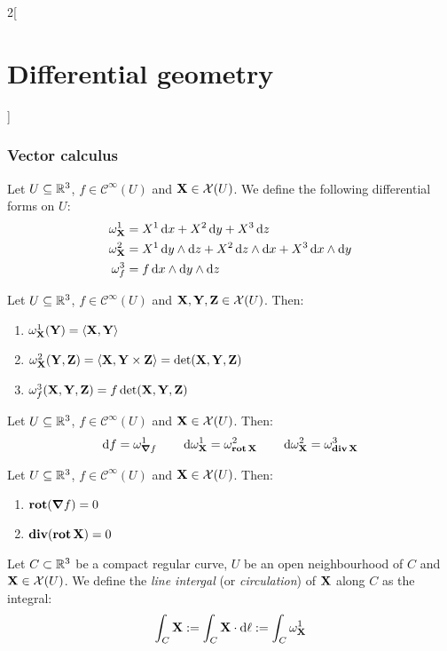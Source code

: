 \documentclass[../../../main_math.tex]{subfiles}
\begin{document}
\begin{multicols}{2}[\section{Differential geometry}]
  \subsubsection{Vector calculus}
  \begin{definition}
    Let $U\subseteq\mathbb{R}^3$, $f\in\mathcal{C}^\infty(U)$ and $\boldsymbol{\mathrm{X}}\in\mathcal{X}(U)$. We define the following differential forms on $U$:
    \begin{align*}
      \omega_{\boldsymbol{\mathrm{X}}}^1 & =X^1\dd{x}+X^2\dd{y}+X^3\dd{z}                                     \\
      \omega_{\boldsymbol{\mathrm{X}}}^2 & =X^1\dd{y}\wedge\dd{z}+X^2\dd{z}\wedge\dd{x}+X^3\dd{x}\wedge\dd{y} \\
      \omega_{f}^3      & =f\dd{x}\wedge\dd{y}\wedge\dd{z}
    \end{align*}
  \end{definition}
  \begin{lemma}
    Let $U\subseteq\mathbb{R}^3$, $f\in\mathcal{C}^\infty(U)$ and $\boldsymbol{\mathrm{X}},\boldsymbol{\mathrm{Y}},\boldsymbol{\mathrm{Z}}\in\mathcal{X}(U)$. Then:
    \begin{enumerate}
      \item $\omega_{\boldsymbol{\mathrm{X}}}^1(\boldsymbol{\mathrm{Y}})=\langle\boldsymbol{\mathrm{X}},\boldsymbol{\mathrm{Y}}\rangle$
      \item $\omega_{\boldsymbol{\mathrm{X}}}^2(\boldsymbol{\mathrm{Y}},\boldsymbol{\mathrm{Z}})=\langle\boldsymbol{\mathrm{X}},\boldsymbol{\mathrm{Y}}\times\boldsymbol{\mathrm{Z}}\rangle=\det(\boldsymbol{\mathrm{X}},\boldsymbol{\mathrm{Y}},\boldsymbol{\mathrm{Z}})$
      \item $\omega_{f}^3(\boldsymbol{\mathrm{X}},\boldsymbol{\mathrm{Y}},\boldsymbol{\mathrm{Z}})=f\det(\boldsymbol{\mathrm{X}},\boldsymbol{\mathrm{Y}},\boldsymbol{\mathrm{Z}})$
    \end{enumerate}
  \end{lemma}
  \begin{proposition}
    Let $U\subseteq\mathbb{R}^3$, $f\in\mathcal{C}^\infty(U)$ and $\boldsymbol{\mathrm{X}}\in\mathcal{X}(U)$. Then:
    $$\dd{f}=\omega_{\grad{f}}^1\qquad\dd{\omega_{\boldsymbol{\mathrm{X}}}^1}=\omega_{\operatorname{\boldsymbol{\mathrm{rot}}}{\boldsymbol{\mathrm{X}}}}^2\qquad\dd{\omega_{\boldsymbol{\mathrm{X}}}^2}=\omega_{\operatorname{\boldsymbol{\mathrm{div}}}{\boldsymbol{\mathrm{X}}}}^3$$
  \end{proposition}
  \begin{corollary}
    Let $U\subseteq\mathbb{R}^3$, $f\in\mathcal{C}^\infty(U)$ and $\boldsymbol{\mathrm{X}}\in\mathcal{X}(U)$. Then:
    \begin{enumerate}
      \item $\operatorname{\boldsymbol{\mathrm{rot}}}(\grad f)=0$
      \item $\operatorname{\boldsymbol{\mathrm{div}}}(\operatorname{\boldsymbol{\mathrm{rot}}}\boldsymbol{\mathrm{X}})=0$
    \end{enumerate}
  \end{corollary}
  \begin{definition}
    Let $C\subset \mathbb{R}^3$ be a compact regular curve, $U$ be an open neighbourhood of $C$ and $\boldsymbol{\mathrm{X}}\in\mathcal{X}(U)$. We define the \emph{line intergal} (or \emph{circulation}) of $\boldsymbol{\mathrm{X}}$ along $C$ as the integral: $$\int_C\boldsymbol{\mathrm{X}}:=\int_C\boldsymbol{\mathrm{X}}\cdot\dd{\ell}:=\int_C\omega_{\boldsymbol{\mathrm{X}}}^1$$

\end{definition}
\end{multicols}
\end{document}
